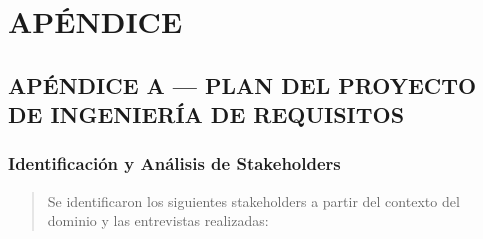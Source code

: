 \documentclass[
]{article}
\begin{document}
\section{APÉNDICE}
\label{apendice-general}
\subsection{APÉNDICE A --- PLAN DEL PROYECTO DE INGENIERÍA DE
REQUISITOS}\label{apuxe9ndice-a-plan-del-proyecto-de-ingenieruxeda-de-requisitos}

\subsubsection{Identificación y Análisis de
Stakeholders}\label{identificaciuxf3n-y-anuxe1lisis-de-stakeholders}

\begin{quote}
Se identificaron los siguientes stakeholders a partir del contexto del
dominio y las entrevistas realizadas:
\end{quote}
\end{document}
